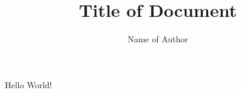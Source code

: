 \documentclass[a4paper]{article}
\title{Title of Document}
\author{Name of Author}
\begin{document}
\maketitle
Hello World!
\end{document}
